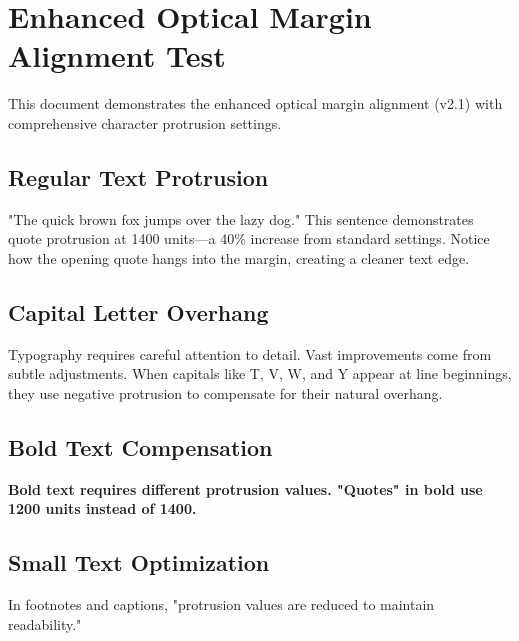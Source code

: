 \documentclass{article}
\begin{document}
\section{Enhanced Optical Margin Alignment Test}

This document demonstrates the enhanced optical margin alignment (v2.1) with comprehensive character protrusion settings.

\subsection{Regular Text Protrusion}

"The quick brown fox jumps over the lazy dog." This sentence demonstrates quote protrusion at 1400 units---a 40\% increase from standard settings. Notice how the opening quote hangs into the margin, creating a cleaner text edge.

\subsection{Capital Letter Overhang}

Typography requires careful attention to detail. Vast improvements come from subtle adjustments. When capitals like T, V, W, and Y appear at line beginnings, they use negative protrusion to compensate for their natural overhang.

\subsection{Bold Text Compensation}

\textbf{Bold text requires different protrusion values. "Quotes" in bold use 1200 units instead of 1400.}

\subsection{Small Text Optimization}

\footnotesize
In footnotes and captions, "protrusion values are reduced to maintain readability."
\normalsize
\end{document}
